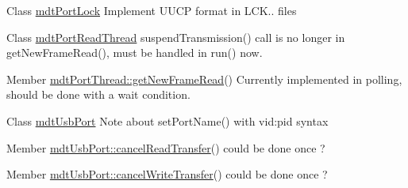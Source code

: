 \label{todo__todo000002}
\hypertarget{todo__todo000002}{}
 
\begin{DoxyDescription}
\item[Class \hyperlink{classmdt_port_lock}{mdtPortLock} ]Implement UUCP format in LCK.. files 
\end{DoxyDescription}

\label{todo__todo000007}
\hypertarget{todo__todo000007}{}
 
\begin{DoxyDescription}
\item[Class \hyperlink{classmdt_port_read_thread}{mdtPortReadThread} ]suspendTransmission() call is no longer in getNewFrameRead(), must be handled in run() now. 
\end{DoxyDescription}

\label{todo__todo000008}
\hypertarget{todo__todo000008}{}
 
\begin{DoxyDescription}
\item[Member \hyperlink{classmdt_port_thread_a611211e56620ec9c699019452716e4fc}{mdtPortThread::getNewFrameRead}() ]Currently implemented in polling, should be done with a wait condition.
\end{DoxyDescription}

\label{todo__todo000024}
\hypertarget{todo__todo000024}{}
 
\begin{DoxyDescription}
\item[Class \hyperlink{classmdt_usb_port}{mdtUsbPort} ]Note about setPortName() with vid:pid syntax 
\end{DoxyDescription}

\label{todo__todo000012}
\hypertarget{todo__todo000012}{}
 
\begin{DoxyDescription}
\item[Member \hyperlink{classmdt_usb_port_a3570b708f9f51408e4bbf2f61cc8c881}{mdtUsbPort::cancelReadTransfer}() ]could be done once ? 
\end{DoxyDescription}

\label{todo__todo000017}
\hypertarget{todo__todo000017}{}
 
\begin{DoxyDescription}
\item[Member \hyperlink{classmdt_usb_port_a7cbe1cd3649861aac5e6a14830f06cf9}{mdtUsbPort::cancelWriteTransfer}() ]could be done once ? 
\end{DoxyDescription}

